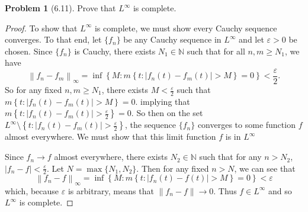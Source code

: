 \documentclass[12pt]{article}
\newcommand{\N}{\mathbb{N}}
\renewcommand{\epsilon}{\varepsilon}
\newcommand{\abs}[1]{
    \left\lvert #1 \right\rvert
}
\newcommand{\norm}[1]{
    \left\lVert #1 \right\rVert
}
\theoremstyle{definition}
\newtheorem{problem}{Problem}
\begin{document}
\begin{problem}[6.11]

    Prove that \( L^{\infty} \) is complete. 

    \begin{proof}
        To show that \( L^{\infty} \) is complete, we must show every Cauchy sequence converges. 
        To that end, let \( \{f_n\} \) be any Cauchy sequence in \( L^{\infty} \) and let \( \epsilon> 0 \) be chosen. 
        Since \( \{f_n\} \) is Cauchy, there exists \( N_1 \in \N \) such that for all \( n, m \geq N_1 \), we have 
            \[
                \norm{f_n - f_m}_{\infty} = \inf \left\{  M : m \left\{ t : \abs{f_n(t) - f_m(t)} > M \right\} = 0 \right\} < \frac{\epsilon}{2}.  
            \]
        So for any fixed \( n,m \geq N_1 \), there exists \( \displaystyle M < \frac{\epsilon}{2} \) such that \( \displaystyle m\left\{ t: \abs{f_n(t) - f_m(t)} > M \right\} = 0 \). implying that  \( \displaystyle m\left\{ t: \abs{f_n(t) - f_m(t)} > \frac{\epsilon}{2} \right\} = 0 \). 
        So then on the set \( L^{\infty} \setminus \left\{ t: \abs{f_n(t) - f_m(t)} > \frac{\epsilon}{2} \right\}  \), the sequence \( \{f_n\} \) converges to some function \( f \) almost everywhere. 
        We must show that this limit function \( f \) is in \( L^{\infty} \)

        Since \( f_n \to f \) almost everywhere, there exists \( N_2 \in \N \) such that for any \( n > N_2 \), \( \displaystyle \abs{f_n - f} < \frac{\epsilon}{2} \). 
        Let \( N = \max\{ N_1, N_2 \} \). 
        Then for any fixed \( n > N \), we can see that 
            \[
                \norm{f_n - f}_{\infty} = \inf \left\{  M : m \left\{ t : \abs{f_n(t) - f(t)} > M \right\} = 0 \right\} < \epsilon 
            \]
        which, because \( \epsilon \) is arbitrary, means that \( \norm{f_n - f} \to 0 \). Thus \( f \in L^{\infty} \) and so \( L^{\infty} \) is complete. 
    \end{proof}
    
\end{problem}
\end{document}

